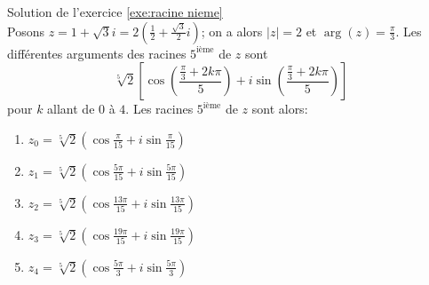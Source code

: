 \begin{corrige}
\begin{sol}
\label{sol:racine nieme}
Solution de l'exercice \ref{exe:racine nieme} \\
Posons $z = 1 + \sqrt{3} i = 2 \left( \frac{1}{2} + \frac{\sqrt{3}}{2} i \right)$; on a alors $|z| = 2$ et $\arg(z) = \frac{\pi}{3}$.
Les diff\'erentes arguments des racines $5^{\text{i\`eme}}$ de $z$ sont 
$$
\sqrt[5]{2}  \left[ \cos \left( \frac{ \frac{\pi }{3} + 2k\pi}{5} \right) + i \sin \left( \frac{ \frac{\pi }{3} + 2k\pi}{5} \right) \right] 
$$ 
pour $k$ allant de $0$ \`a $4$.
Les racines $5^{\text{i\`eme}}$ de $z$ sont alors: 
\begin{enumerate}
\item $ z_0 = \sqrt[5]{2} \left( \cos \frac{\pi}{15} + i \sin \frac{\pi}{15} \right)         $
\item $ z_1 = \sqrt[5]{2} \left( \cos \frac{5 \pi}{15} + i \sin \frac{5 \pi}{15} \right)     $
\item $ z_2 = \sqrt[5]{2} \left( \cos \frac{13 \pi}{15} + i \sin \frac{13 \pi}{15} \right)   $
\item $ z_3 = \sqrt[5]{2} \left( \cos \frac{19 \pi}{15} + i \sin \frac{19 \pi}{15} \right)   $
\item $ z_4 = \sqrt[5]{2} \left( \cos \frac{5 \pi}{3} + i \sin \frac{5 \pi}{3} \right)       $
\end{enumerate}
\end{sol}
\end{corrige}

